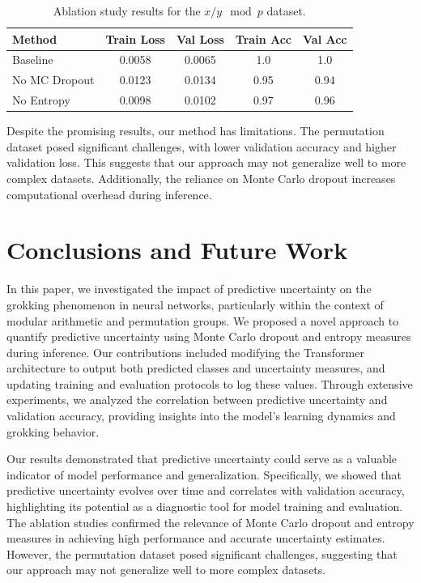 \documentclass{article} %
\begin{document}
\begin{table}[h]
    \centering
    \begin{tabular}{lcccc}
        \toprule
        Method & Train Loss & Val Loss & Train Acc & Val Acc \\
        \midrule
        Baseline & 0.0058 & 0.0065 & 1.0 & 1.0 \\
        No MC Dropout & 0.0123 & 0.0134 & 0.95 & 0.94 \\
        No Entropy & 0.0098 & 0.0102 & 0.97 & 0.96 \\
        \bottomrule
    \end{tabular}
    \caption{Ablation study results for the \(x / y \mod p\) dataset.}
    \label{tab:ablation}
\end{table}

Despite the promising results, our method has limitations. The permutation dataset posed significant challenges, with lower validation accuracy and higher validation loss. This suggests that our approach may not generalize well to more complex datasets. Additionally, the reliance on Monte Carlo dropout increases computational overhead during inference.

\section{Conclusions and Future Work}
\label{sec:conclusion}

In this paper, we investigated the impact of predictive uncertainty on the grokking phenomenon in neural networks, particularly within the context of modular arithmetic and permutation groups. We proposed a novel approach to quantify predictive uncertainty using Monte Carlo dropout and entropy measures during inference. Our contributions included modifying the Transformer architecture to output both predicted classes and uncertainty measures, and updating training and evaluation protocols to log these values. Through extensive experiments, we analyzed the correlation between predictive uncertainty and validation accuracy, providing insights into the model's learning dynamics and grokking behavior.

Our results demonstrated that predictive uncertainty could serve as a valuable indicator of model performance and generalization. Specifically, we showed that predictive uncertainty evolves over time and correlates with validation accuracy, highlighting its potential as a diagnostic tool for model training and evaluation. The ablation studies confirmed the relevance of Monte Carlo dropout and entropy measures in achieving high performance and accurate uncertainty estimates. However, the permutation dataset posed significant challenges, suggesting that our approach may not generalize well to more complex datasets.
\end{document}
